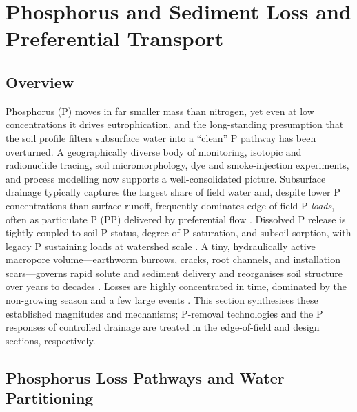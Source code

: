 \section{Phosphorus and Sediment Loss and Preferential Transport}

\subsection{Overview}

Phosphorus (P) moves in far smaller mass than nitrogen, yet even at low
concentrations it drives eutrophication, and the long-standing presumption
that the soil profile filters subsurface water into a ``clean'' P pathway
has been overturned. A geographically diverse body of monitoring, isotopic
and radionuclide tracing, soil micromorphology, dye and smoke-injection
experiments, and process modelling now supports a well-consolidated
picture. Subsurface drainage typically captures the largest share of field
water and, despite lower P concentrations than surface runoff, frequently
dominates edge-of-field P \emph{loads}, often as particulate P (PP)
delivered by preferential flow
\parencite{Pease2018,VanEsbroeck2016,Uusitalo2001,Laubel1999}. Dissolved P
release is tightly coupled to soil P status, degree of P saturation, and
subsoil sorption, with legacy P sustaining loads at watershed scale
\parencite{Sharpley1995,Beauchemin2003,Jarvie2017}. A tiny, hydraulically
active macropore volume---earthworm burrows, cracks, root channels, and
installation scars---governs rapid solute and sediment delivery and
reorganises soil structure over years to decades
\parencite{Shipitalo2004,Villholth1998,Montagne2008}. Losses are highly
concentrated in time, dominated by the non-growing season and a few large
events \parencite{VanEsbroeck2016,Brendel2019}. This section synthesises
these established magnitudes and mechanisms; P-removal technologies and the
P responses of controlled drainage are treated in the edge-of-field and
design sections, respectively.

\subsection{Phosphorus Loss Pathways and Water Partitioning}


